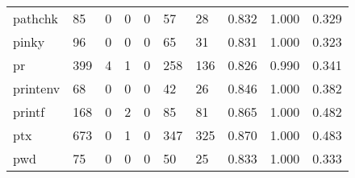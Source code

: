 \begin{longtable}{lp{2.0cm}p{2.0cm}p{2.0cm}p{2.0cm}p{2.0cm}p{2.0cm}p{2.0cm}p{2.0cm}p{2.0cm}}
pathchk   &                     85 &                                             0 &                                            0 &                                           0 &                                           57 &                                         28 &                                0.832 &                                  1.000 &                                0.329 \\
pinky     &                     96 &                                             0 &                                            0 &                                           0 &                                           65 &                                         31 &                                0.831 &                                  1.000 &                                0.323 \\
pr        &                    399 &                                             4 &                                            1 &                                           0 &                                          258 &                                        136 &                                0.826 &                                  0.990 &                                0.341 \\
printenv  &                     68 &                                             0 &                                            0 &                                           0 &                                           42 &                                         26 &                                0.846 &                                  1.000 &                                0.382 \\
printf    &                    168 &                                             0 &                                            2 &                                           0 &                                           85 &                                         81 &                                0.865 &                                  1.000 &                                0.482 \\
ptx       &                    673 &                                             0 &                                            1 &                                           0 &                                          347 &                                        325 &                                0.870 &                                  1.000 &                                0.483 \\
pwd       &                     75 &                                             0 &                                            0 &                                           0 &                                           50 &                                         25 &                                0.833 &                                  1.000 &                                0.333 \\

\end{longtable}
